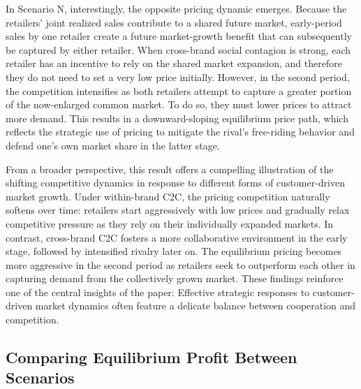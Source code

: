 \documentclass[nonblindrev,copyedit]{informs1}
\begin{document}
In Scenario N, interestingly, the opposite pricing dynamic emerges. Because the retailers’ joint realized sales contribute to a shared future market, early-period sales by one retailer create a future market-growth benefit that can subsequently be captured by either retailer. When cross-brand social contagion is strong, each retailer has an incentive to rely on the shared market expansion, and therefore they do not need to set a very low price initially. However, in the second period, the competition intensifies as both retailers attempt to capture a greater portion of the now-enlarged common market. To do so, they must lower prices to attract more demand. This results in a downward-sloping equilibrium price path, which reflects the strategic use of pricing to mitigate the rival’s free-riding behavior and defend one's own market share in the latter stage.

From a broader perspective, this result offers a compelling illustration of the shifting competitive dynamics in response to different forms of customer-driven market growth. Under within-brand C2C, the pricing competition naturally softens over time: retailers start aggressively with low prices and gradually relax competitive pressure as they rely on their individually expanded markets. In contrast, cross-brand C2C fosters a more collaborative environment in the early stage, followed by intensified rivalry later on. The equilibrium pricing becomes more aggressive in the second period as retailers seek to outperform each other in capturing demand from the collectively grown market. These findings reinforce one of the central insights of the paper: Effective strategic responses to customer-driven market dynamics often feature a delicate balance between cooperation and competition.

\subsection{Comparing Equilibrium Profit Between Scenarios} \label{sec:pricing-compare-pft}
\end{document}
